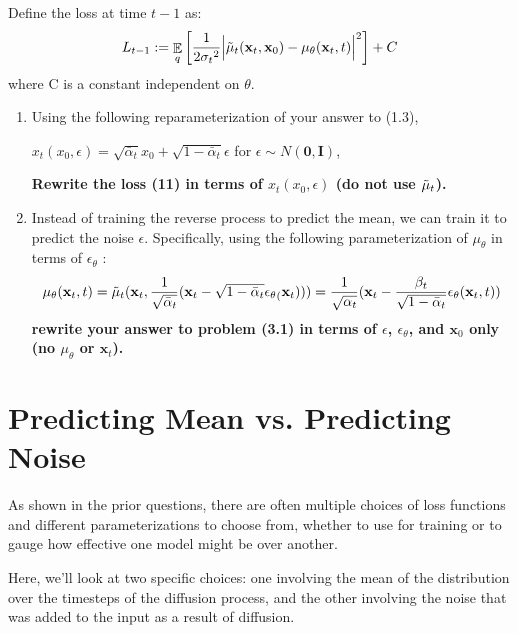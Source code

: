 \documentclass{article}
\DeclareMathOperator{\EX}{\mathbb{E}}%
\begin{document}
Define the loss at time $t-1$ as:
\begin{equation}
    L_{t-1} := \EX_q\left[\frac{1}{2{\sigma_t}^2}
    \Big\lvert {\Tilde\mu_t}(\textbf{x}_t, \textbf{x}_0) - {\mu_\theta}(\textbf{x}_t, t)\Big\rvert^2\right] + C
\end{equation}
where C is a constant independent on $\theta$. 

\begin{enumerate}
    \item 
    Using the following reparameterization of your answer to (1.3), 
    
    ${x_t}(x_0, \epsilon) = \sqrt{\bar\alpha_t}x_0 + \sqrt{1 - \bar\alpha_t}\epsilon $  for $\epsilon \sim N(\boldsymbol{0}, \boldsymbol{I})$, 
    
    \textbf{Rewrite the loss (11) in terms of ${x_t}(x_0, \epsilon)$ (do not use $\Tilde\mu_t$).}

    \item 
    Instead of training the reverse process to predict the mean, we can train it to predict the noise $\epsilon$. Specifically, using the following parameterization of $\mu_\theta$ in terms of $\epsilon_\theta$ :
    \begin{equation}
        {\mu_\theta}(\textbf{x}_t, t) = {{\Tilde\mu}_t}(\textbf{x}_t, \frac{1}{\sqrt{{\bar\alpha}_t}}(\textbf{x}_t - \sqrt{1 - {\bar\alpha}_t}{\epsilon_\theta}_(\textbf{x}_t))) = \frac{1}{\sqrt{\alpha_t}}(\textbf{x}_t - \frac{\beta_t}{\sqrt{1 - {\bar\alpha}_t}}{\epsilon_\theta}(\textbf{x}_t, t))
    \end{equation}
    \textbf{rewrite your answer to problem (3.1) in terms of  $\epsilon$, $\epsilon_\theta$, and $\textbf{x}_0$ only (no $\mu_\theta$ or $\textbf{x}_t$).}

\end{enumerate}



\section{Predicting Mean vs. Predicting Noise}

As shown in the prior questions, there are often multiple choices of loss functions and different parameterizations to choose from, whether to use for training or to gauge how effective one model might be over another.

Here, we'll look at two specific choices: one involving the mean of the distribution over the timesteps of the diffusion process, and the other involving the noise that was added to the input as a result of diffusion.
\end{document}
